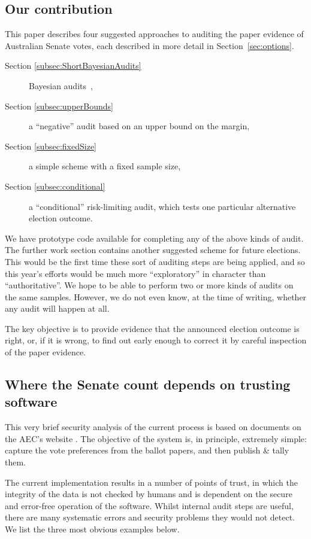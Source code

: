 \documentclass[10pt,a4paper]{article}
\newcommand{\longVersion}[1]{#1}
\newcommand{\longVersion}[1]{}
\begin{document}
\subsection{Our contribution}
This paper describes four suggested approaches to auditing the paper evidence of Australian Senate votes, each described in more detail in Section~\ref{sec:options}.  
\begin{description}
	\item[Section \ref{subsec:ShortBayesianAudits}] Bayesian audits~\cite{rivest2012bayesian},
	\item[Section \ref{subsec:upperBounds}] a ``negative'' audit based on an upper bound on the margin, 
	\item[Section \ref{subsec:fixedSize}] a simple scheme with a fixed sample size,  
	\item[Section \ref{subsec:conditional}] a ``conditional'' risk-limiting audit, which tests one particular alternative election outcome.

\end{description}

We have prototype code available for completing any of the above kinds of audit.  
\longVersion{The further work section contains another suggested scheme for future elections.}
This would be the first time these sort of auditing steps are being applied, and so this year's efforts would be much more ``exploratory'' in character than ``authoritative''.  We hope to be able to perform two or more kinds of audits on the same samples.  However, we do not even know, at the time of writing, whether any audit will happen at all.  

The key objective is to provide evidence that the announced election outcome is right, or, if it is wrong, to find out early enough to correct it by careful inspection of the paper evidence.

\subsection{Where the Senate count depends on trusting software}
This very brief security analysis of the current process is based on documents on the AEC's website  \cite{AECSenateDesign}.
The objective of the system is, in principle, extremely simple:
capture the vote preferences from the ballot papers, and then publish
\& tally them. 

The current implementation results in a number of points of trust, in which the integrity of the data is not checked by humans and is dependent on the secure and error-free operation of the software. Whilst internal audit steps are useful, there are many systematic errors and security problems they would not detect.  We list the three most obvious examples below. 
\end{document}
